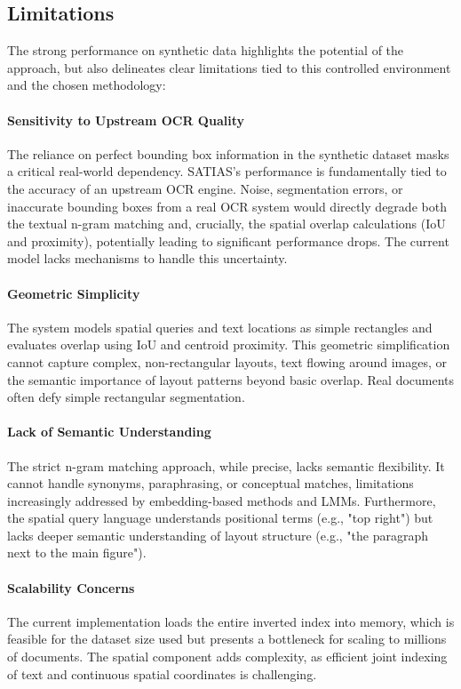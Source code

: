 \documentclass[manuscript,screen]{acmart}
\begin{document}
\subsection{Limitations}

The strong performance on synthetic data highlights the potential of the approach, but also delineates clear limitations tied to this controlled environment and the chosen methodology:

\paragraph{Sensitivity to Upstream OCR Quality}
The reliance on perfect bounding box information in the synthetic dataset masks a critical real-world dependency. SATIAS's performance is fundamentally tied to the accuracy of an upstream OCR engine. Noise, segmentation errors, or inaccurate bounding boxes from a real OCR system would directly degrade both the textual n-gram matching and, crucially, the spatial overlap calculations (IoU and proximity), potentially leading to significant performance drops. The current model lacks mechanisms to handle this uncertainty.

\paragraph{Geometric Simplicity}
The system models spatial queries and text locations as simple rectangles and evaluates overlap using IoU and centroid proximity. This geometric simplification cannot capture complex, non-rectangular layouts, text flowing around images, or the semantic importance of layout patterns beyond basic overlap. Real documents often defy simple rectangular segmentation.

\paragraph{Lack of Semantic Understanding}
The strict n-gram matching approach, while precise, lacks semantic flexibility. It cannot handle synonyms, paraphrasing, or conceptual matches, limitations increasingly addressed by embedding-based methods and LMMs. Furthermore, the spatial query language understands positional terms (e.g., "top right") but lacks deeper semantic understanding of layout structure (e.g., "the paragraph next to the main figure").

\paragraph{Scalability Concerns}
The current implementation loads the entire inverted index into memory, which is feasible for the dataset size used but presents a bottleneck for scaling to millions of documents. The spatial component adds complexity, as efficient joint indexing of text and continuous spatial coordinates is challenging.
\end{document}
